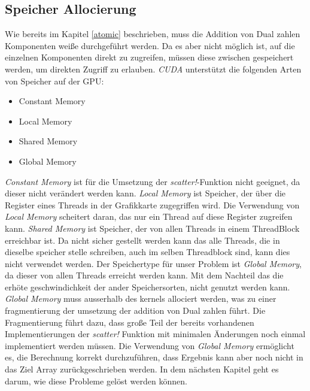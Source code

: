 \subsection{Speicher Allocierung} \label{memory}

Wie bereits im Kapitel \ref{atomic} beschrieben, 
muss die Addition von Dual zahlen Komponenten weiße durchgeführt werden.
Da es aber nicht möglich ist, auf die einzelnen Komponenten direkt zu zugreifen,
müssen diese zwischen gespeichert werden, um direkten Zugriff zu erlauben.
\textit{CUDA} unterstützt die folgenden Arten von Speicher auf der GPU:

\begin{itemize}
	\item Constant Memory
	\item Local Memory
	\item Shared Memory
	\item Global Memory
\end{itemize}

\textit{Constant Memory} ist für die Umsetzung der \textit{scatter!}-Funktion nicht geeignet,
da dieser nicht verändert werden kann.
\textit{Local Memory} ist Speicher, 
der über die Register eines Threads in der Grafikkarte zugegriffen wird.
Die Verwendung von \textit{Local Memory} scheitert daran, 
das nur ein Thread auf diese Register zugreifen kann.
\textit{Shared Memory} ist Speicher, 
der von allen Threads in einem ThreadBlock erreichbar ist.
Da nicht sicher gestellt werden kann das alle Threads, 
die in dieselbe speicher stelle schreiben, auch im selben Threadblock sind,
kann dies nicht verwendet werden.
Der Speichertype für unser Problem ist \textit{Global Memory}, 
da dieser von allen Threads erreicht werden kann.
Mit dem Nachteil das die erhöte geschwindichkeit der ander Speichersorten, 
nicht genutzt werden kann.
\textit{Global Memory} muss ausserhalb des kernels allociert werden, 
was zu einer fragmentierung der umsetzung der addition von Dual zahlen führt.
Die Fragmentierung führt dazu, 
dass große Teil der bereits vorhandenen Implementierungen der \textit{scatter!} Funktion mit minimalen Änderungen noch einmal
implementiert werden müssen.
Die Verwendung von \textit{Global Memory} ermöglicht es, die Berechnung korrekt durchzuführen,
dass Ergebnis kann aber noch nicht in das Ziel Array zurückgeschrieben werden.
In dem nächsten Kapitel geht es darum, wie diese Probleme gelöst werden können.
